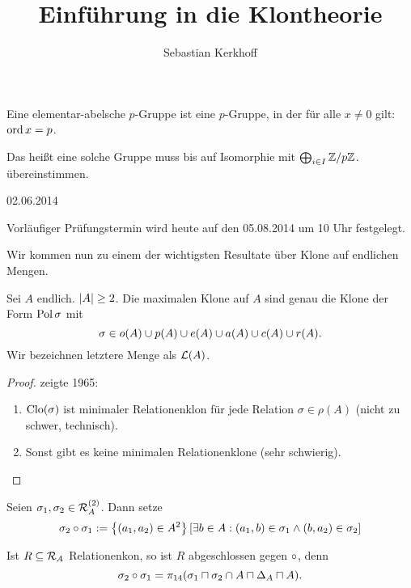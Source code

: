 \documentclass{book}
\begin{document}
\title{Einführung in die Klontheorie}
\author{Sebastian Kerkhoff}
\pagestyle{empty}
\maketitle
\clearpage

\begin{definition}\label{elem-ab-p-group}
    Eine elementar-abelsche $p$-Gruppe ist eine $p$-Gruppe, in der für alle $x\neq 0$ gilt:
    $\mathop\mathrm{ord} x = p$.
\end{definition}

\begin{remark}
    Das heißt eine solche Gruppe muss bis auf Isomorphie mit $\bigoplus_{i\in I}{\mathbb{Z}/p\mathbb{Z}}$. übereinstimmen.
\end{remark}

\hfill{02.06.2014}

Vorläufiger Prüfungstermin wird heute auf den 05.08.2014 um 10 Uhr festgelegt.

Wir kommen nun zu einem der wichtigsten Resultate über Klone auf endlichen Mengen.

\begin{theorem}
    Sei $A$ endlich. $\left|A\right|\geq 2$. Die maximalen Klone auf $A$ sind genau die Klone der Form $\mathop\mathrm{Pol}\sigma$ mit
    $$
    \sigma\in o(A)\cup p(A)\cup e(A)\cup a(A)\cup c(A)\cup r(A).
    $$
    Wir bezeichnen letztere Menge als $\mathcal{L}(A)$.
\end{theorem}

\begin{proof}
     zeigte 1965:
    \begin{enumerate}
            \item $\mathrm{Clo}(\sigma)$ ist minimaler Relationenklon für jede Relation $\sigma\in\rho(A)$ (nicht zu schwer, technisch).
            \item Sonst gibt es keine minimalen Relationenklone (sehr schwierig).
    \end{enumerate}
\end{proof}

\begin{definition}
    Seien $\sigma_1,\sigma_2\in \mathcal{R}_A^{(2)}$. Dann setze
    $$
    \sigma_2\circ\sigma_1:=\left\{(a_1,a_2)\in A^2\right\}[\exists b\in A:(a_1,b)\in\sigma_1\wedge (b,a_2)\in\sigma_2]
    $$
\end{definition}

\begin{remark}
    Ist $R\subseteq \mathcal{R}_A$ Relationenkon, so ist $R$ abgeschlossen gegen $\circ$, denn
    $$
    \sigma_2\compose\sigma_1=\pi_{14}(\sigma_1\settimes\sigma_2\setmeet A\settimes \Delta_A\settimes A).
    $$
\end{remark}
\end{document}
